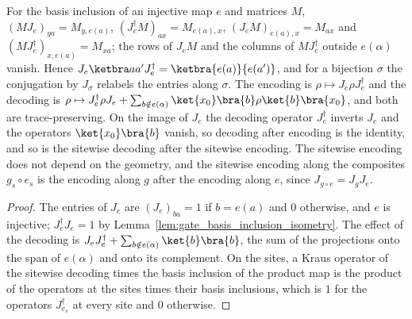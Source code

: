 \begin{lemma}
    \label{lem:protocols_encoding}
    \leanok
    For the basis inclusion of an injective map $e$ and matrices $M$,
    $(MJ_e)_{ya}=M_{y,e(a)}$, $(J_e^\dagger M)_{ax}=M_{e(a),x}$, $(J_eM)_{e(a),x}=M_{ax}$ and
    $(MJ_e^\dagger)_{x,e(a)}=M_{xa}$; the rows of $J_eM$ and the columns of $MJ_e^\dagger$
    outside $e(\alpha)$ vanish. Hence $J_e\ketbra a{a'}J_e^\dagger=\ketbra{e(a)}{e(a')}$, and
    for a bijection $\sigma$ the conjugation by $J_\sigma$ relabels the entries along $\sigma$. The encoding is $\rho\mapsto J_e\rho J_e^\dagger$ and the decoding is
    $\rho\mapsto J_e^\dagger\rho J_e+\sum_{b\notin e(\alpha)}\ket{x_0}\bra{b}\rho\ket{b}\bra{x_0}$, and
    both are trace-preserving. On the image of $J_e$ the
    decoding operator $J_e^\dagger$ inverts $J_e$ and the operators $\ket{x_0}\bra{b}$ vanish,
    so decoding after encoding is the identity, and so is the sitewise decoding after the
    sitewise encoding. The sitewise encoding does not depend on the geometry, and the sitewise
    encoding along the composites $g_s\circ e_s$ is the encoding along $g$ after the encoding
    along $e$, since $J_{g\circ e}=J_gJ_e$.
\end{lemma}
\begin{proof}\leanok
    The entries of $J_e$ are $(J_e)_{ba}=1$ if $b=e(a)$ and $0$ otherwise, and $e$ is
    injective; $J_e^\dagger J_e=1$ by Lemma~\ref{lem:gate_basis_inclusion_isometry}. The effect
    of the decoding is $J_eJ_e^\dagger+\sum_{b\notin e(\alpha)}\ket{b}\bra{b}$,
    the sum of the projections onto the span of $e(\alpha)$ and onto its complement. On the
    sites, a Kraus operator of the sitewise decoding times the basis inclusion of the product
    map is the product of the operators at the sites times their basis inclusions, which is $1$
    for the operators $J_{e_s}^\dagger$ at every site and $0$ otherwise.
\end{proof}

